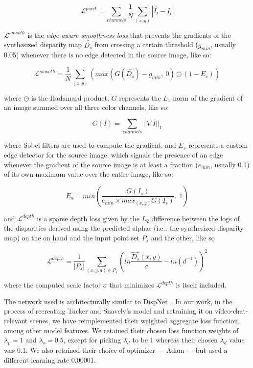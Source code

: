 \begin{itemize}
    \[\mathcal{L}^{pixel} = \sum_{channels} \frac{1}{N} \sum_{(x,y)} |\hat{I_t} - I_t|\]
    
    $\mathcal{L}^{smooth}$ is the \textit{edge-aware smoothness loss} that prevents the gradients of the synthesized disparity map $\hat{D_s}$ from crossing a certain threshold ($g_{min}$, usually 0.05) whenever there is no edge detected in the source image, like so: 
    
    \[\mathcal{L}^{smooth} = \frac{1}{N} \sum_{(x,y)} \left(max\left(G(\hat{D_s}) - g_{min},\ 0\right) \odot (1 - E_s)\right)\]
    
    where $\odot$ is the Hadamard product, $G$ represents the $L_1$ norm of the gradient of an image summed over all three color channels, like so:
    
    \[G(I) = \sum_{channels} ||\nabla I||_1\]
    
    where Sobel filters are used to compute the gradient, and $E_s$ represents a custom edge detector for the source image, which signals the presence of an edge whenever the gradient of the source image is at least a fraction ($e_{min}$, usually 0.1) of its own maximum value over the entire image, like so:
    
    \[E_s = min \left(\frac{G(I_s)}{e_{min} \times max_{(x,y)} G(I_s)},\ 1\right)\]
    
    and $\mathcal{L}^{depth}$ is a sparse depth loss given by the $L_2$ difference between the logs of the disparities derived using the predicted alphas (i.e., the synthesized disparity map) on the on hand and the input point set $P_s$ and the other, like so
    
    \[\mathcal{L}^{depth} = \frac{1}{|P_s|} \sum_{(x,y,d) \in P_s} \left(ln\frac{\hat{D_s}(x,y)}{\sigma} - ln(d^{-1})\right)^2\]
    
    where the computed scale factor $\sigma$ that minimizes $\mathcal{L}^{depth}$ is itself included.
\end{itemize}

The network used is architecturally similar to DispNet~\cite{mayer_large_2016}. In our work, in the process of recreating Tucker and Snavely's model and retraining it on video-chat-relevant scenes, we have reimplemented their weighted aggregate loss function, among other model features. We retained their chosen loss function weights of $\lambda_p = 1$ and $\lambda_s = 0.5$, except for picking $\lambda_d$ to be 1 whereas their chosen $\lambda_d$ value was 0.1. We also retained their choice of optimizer --- Adam --- but used a different learning rate 0.00001.

